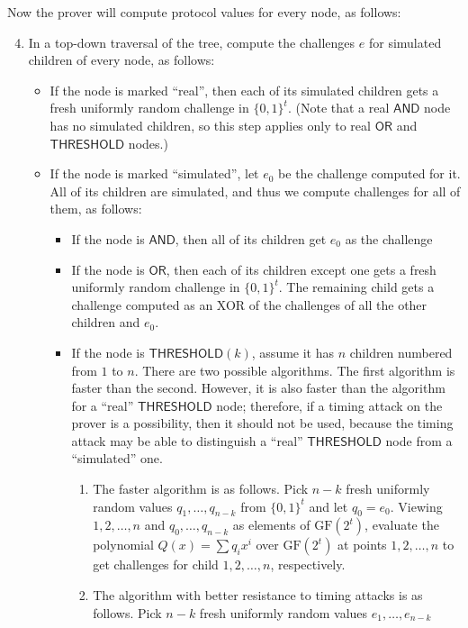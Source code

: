 \documentclass[11pt]{article}
\newcommand{\andnode}{\ensuremath{\mathsf{AND}}}
\newcommand{\ornode}{\ensuremath{\mathsf{OR}}}
\newcommand{\tnode}{\ensuremath{\mathsf{THRESHOLD}}}
\newcommand{\GF}{\ensuremath{\mathrm{GF}}}
\begin{document}
\noindent
Now the prover will compute protocol values for every node, as follows:

\begin{enumerate}
\setcounter{enumi}{3}
    \item In a top-down traversal of the tree, compute the challenges $e$ for simulated children of every node, as follows:
    \begin{itemize}
        \item If the node is marked ``real'', then each of its simulated children gets  a fresh uniformly random challenge in $\{0,1\}^t$. (Note that a real $\andnode$ node has no simulated children, so this step applies only to real $\ornode$ and $\tnode$ nodes.)
        \item If the node is marked ``simulated'', let $e_0$ be the challenge computed for it.  All of its children are simulated, and thus we compute challenges for all of them, as follows:
        \begin{itemize}
            \item If the node is $\andnode$,  then all of its children get $e_0$ as the challenge
            \item If the node is $\ornode$, then each of its children except one gets a fresh uniformly random challenge in $\{0,1\}^t$. The remaining child gets a challenge computed as an XOR of the challenges of all the other children and $e_0$.
            \item If the node is $\tnode(k)$, assume it has $n$ children numbered from $1$ to $n$. There are two possible algorithms. The first algorithm is faster than the second. However, it is also faster than the algorithm for a ``real'' $\tnode$ node; therefore, if a timing attack on the prover is a possibility, then it should not be used, because the timing attack may be able to distinguish a ``real'' $\tnode$ node from a ``simulated'' one.
            \begin{enumerate}
            	\item The faster algorithm is as follows. Pick  $n-k$ fresh uniformly random values $q_1, \dots, q_{n-k}$ from $\{0,1\}^t$ and let
	         $q_0=e_0$. Viewing $1, 2, \dots, n$ and $q_0, \dots, q_{n-k}$ as elements of $\GF(2^t)$,
	         evaluate the polynomial $Q(x) = \sum {q_i x^i}$ over $\GF(2^t)$ at points $1, 2, \dots, n$
	         to get challenges for child $1, 2, \dots, n$, respectively.
	         \item The algorithm with better resistance to timing attacks is as follows. Pick $n-k$ fresh uniformly random values $e_1, \dots, e_{n-k}$

\end{enumerate}
\end{itemize}
\end{itemize}
\end{enumerate}
\end{document}
